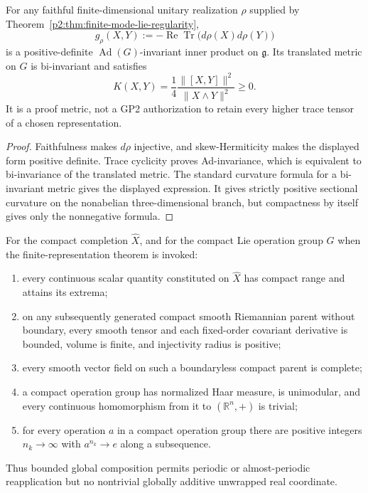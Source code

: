 \documentclass[11pt,a4paper]{article}
\begin{document}
\begin{theorem}
\label{p2:thm:finite-mode-trace-metric}
For any faithful finite-dimensional unitary realization \(\rho\) supplied by
Theorem~\ref{p2:thm:finite-mode-lie-regularity},
\[
 g_\rho(X,Y):=-\operatorname{Re}\operatorname{Tr}
 \bigl(d\rho(X)d\rho(Y)\bigr)
\]
is a positive-definite \(\operatorname{Ad}(G)\)-invariant inner product on
\(\mathfrak g\).  Its translated metric on \(G\) is bi-invariant and satisfies
\[
 K(X,Y)=\frac14
 \frac{\lVert[X,Y]\rVert^2}{\lVert X\wedge Y\rVert^2}\ge0.
\]
It is a proof metric, not a GP2 authorization to retain every higher trace
tensor of a chosen representation.
\end{theorem}

\begin{proof}
Faithfulness makes \(d\rho\) injective, and skew-Hermiticity makes the displayed
form positive definite.  Trace cyclicity proves Ad-invariance, which is
equivalent to bi-invariance of the translated metric.  The standard curvature
formula for a bi-invariant metric \cite{Milnor1976} gives the displayed
expression.  It gives
strictly positive sectional curvature on the nonabelian three-dimensional
branch, but compactness by itself gives only the nonnegative formula.
\end{proof}

\begin{theorem}
\label{p2:thm:gp1-compact-geometric-consequences}
For the compact completion \(\widehat X\), and for the compact Lie operation
group \(G\) when the finite-representation theorem is invoked:
\begin{enumerate}[label=(\roman*), leftmargin=2em]
\item every continuous scalar quantity constituted on \(\widehat X\) has
compact range and attains its extrema;
\item on any subsequently generated compact smooth Riemannian parent without
boundary, every smooth tensor and each fixed-order covariant derivative is
bounded, volume is finite, and injectivity radius is positive;
\item every smooth vector field on such a boundaryless compact parent is
complete;
\item a compact operation group has normalized Haar measure, is unimodular,
and every continuous homomorphism from it to \((\mathbb R^n,+)\) is trivial;
\item for every operation \(a\) in a compact operation group there are positive
integers \(n_k\to\infty\) with \(a^{n_k}\to e\) along a subsequence.
\end{enumerate}
Thus bounded global composition permits periodic or almost-periodic
reapplication but no nontrivial globally additive unwrapped real coordinate.
\end{theorem}
\end{document}
